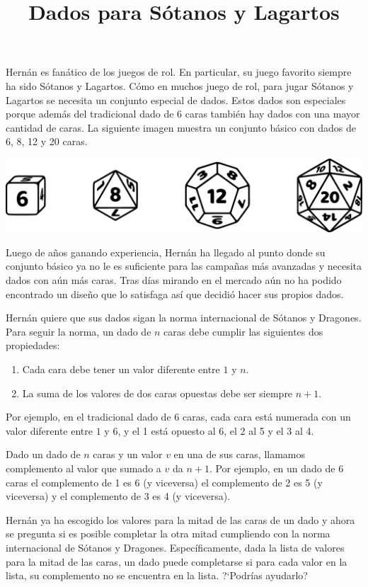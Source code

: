 \documentclass{oci}
\title{Dados para Sótanos y Lagartos}
\begin{document}
\begin{problemDescription}
  Hernán es fanático de los juegos de rol.
  En particular, su juego favorito siempre ha sido Sótanos y Lagartos.
  Cómo en muchos juego de rol, para jugar Sótanos y Lagartos se
  necesita un conjunto especial de dados.
  Estos dados son especiales porque además del tradicional
  dado de 6 caras también hay dados con una mayor cantidad de caras.
  La siguiente imagen muestra un conjunto básico con dados de
  6, 8, 12 y 20 caras.
  \begin{center}
    \includegraphics[scale=0.2]{horizontal-sin4}
  \end{center}

  Luego de años ganando experiencia, Hernán ha llegado al
  punto donde su conjunto básico ya no le es suficiente para
  las campañas más avanzadas y necesita dados con aún más caras.
  Tras días mirando en el mercado aún no ha podido encontrado
  un diseño que lo satisfaga así que decidió hacer sus propios
  dados.

  Hernán quiere que sus dados sigan la norma internacional
  de Sótanos y Dragones.
  Para seguir la norma, un dado de $n$ caras debe cumplir las
  siguientes dos propiedades:
  \begin{enumerate}
    \item Cada cara debe tener un valor diferente entre $1$ y $n$.
    \item La suma de los valores de dos caras opuestas debe ser siempre $n+1$.
  \end{enumerate}
  Por ejemplo, en el tradicional dado de 6 caras, cada cara está numerada
  con un valor diferente entre $1$ y $6$, y el 1 está opuesto al 6,
  el 2 al 5 y el 3 al 4.

  Dado un dado de $n$ caras y un valor $v$ en una de sus caras, llamamos
  complemento al valor que sumado a $v$ da $n+1$.
  Por ejemplo, en un dado de 6 caras el complemento de 1 es 6 (y viceversa)
  el complemento de 2 es 5 (y viceversa) y el complemento de 3 es 4 (y viceversa).

  Hernán ya ha escogido los valores para la mitad
  de las caras de un dado y ahora se pregunta si es posible completar
  la otra mitad cumpliendo con la norma internacional de
  Sótanos y Dragones.
  Específicamente, dada la lista de valores para la mitad de las caras, un
  dado puede completarse si para cada valor en la lista, su complemento no se
  encuentra en la lista.
  ?`Podrías ayudarlo?
\end{problemDescription}
\end{document}
